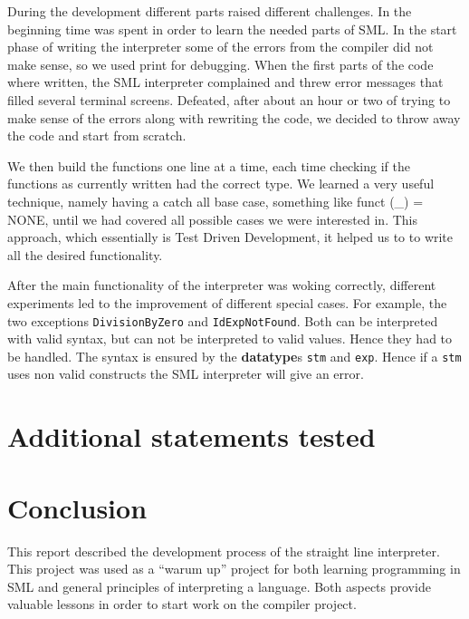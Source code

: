 \documentclass[a4paper]{article}
\begin{document}
During the development different parts raised different challenges. In the beginning time was spent in order to learn the needed parts of SML. In the start phase of writing the interpreter some of the errors from the compiler did not make sense, so we used print for debugging. When the first parts of the code where written, the SML interpreter complained and threw error messages that filled several terminal screens. Defeated, after about an hour or two of trying to make sense of the errors along with rewriting the code, we decided to throw away the code and start from scratch.

We then build the functions one line at a time, each time checking if the functions as currently written had the correct type. We learned a very useful technique, namely having a catch all base case, something like funct (\_) = NONE, until we had covered all possible cases we were interested in. This approach, which essentially is Test Driven Development, it helped us to to write all the desired functionality.

After the main functionality of the interpreter was woking correctly, different experiments led to the improvement of different special cases. For example, the two exceptions \texttt{DivisionByZero} and \texttt{IdExpNotFound}. Both can be interpreted with valid syntax, but can not be interpreted to valid values. Hence they had to be handled. The syntax is ensured by the \textbf{datatype}s \texttt{stm} and \texttt{exp}. Hence if a \texttt{stm} uses non valid constructs the SML interpreter will give an error.



\section{Additional statements tested}

\section{Conclusion}
This report described the development process of the straight line interpreter. This project was used as a ``warum up'' project for both learning programming in SML and general principles of interpreting a language. Both aspects provide valuable lessons in order to start work on the compiler project. 
\end{document}

